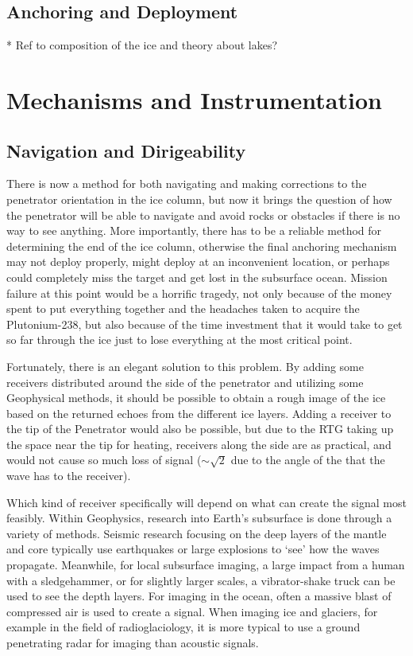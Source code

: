 

\subsection{Anchoring and Deployment}

* Ref to composition of the ice and theory about lakes?

\section{Mechanisms and Instrumentation}

\subsection{Navigation and Dirigeability}



There is now a method for both navigating and making corrections to the penetrator orientation in the ice column, but now it brings the question of how the penetrator will be able to navigate and avoid rocks or obstacles if there is no way to see anything. More importantly, there has to be a reliable method for determining the end of the ice column, otherwise the final anchoring mechanism may not deploy properly, might deploy at an inconvenient location, or perhaps could completely miss the target and get lost in the subsurface ocean. Mission failure at this point would be a horrific tragedy, not only because of the money spent to put everything together and the headaches taken to acquire the Plutonium-238, but also because of the time investment that it would take to get so far through the ice just to lose everything at the most critical point.

Fortunately, there is an elegant solution to this problem. By adding some receivers distributed around the side of the penetrator and utilizing some Geophysical methods, it should be possible to obtain a rough image of the ice based on the returned echoes from the different ice layers. Adding a receiver to the tip of the Penetrator would also be possible, but due to the RTG taking up the space near the tip for heating, receivers along the side are as practical, and would not cause so much loss of signal ($\sim \sqrt{2}$ due to the angle of the that the wave has to the receiver).

Which kind of receiver specifically will depend on what can create the signal most feasibly. Within Geophysics, research into Earth's subsurface is done through a variety of methods. Seismic research focusing on the deep layers of the mantle and core typically use earthquakes or large explosions to `see' how the waves propagate. Meanwhile, for local subsurface imaging, a large impact from a human with a sledgehammer, or for slightly larger scales, a vibrator-shake truck can be used to see the depth layers. For imaging in the ocean, often a massive blast of compressed air is used to create a signal. When imaging ice and glaciers, for example in the field of radioglaciology, it is more typical to use a ground penetrating radar for imaging than acoustic signals. 

